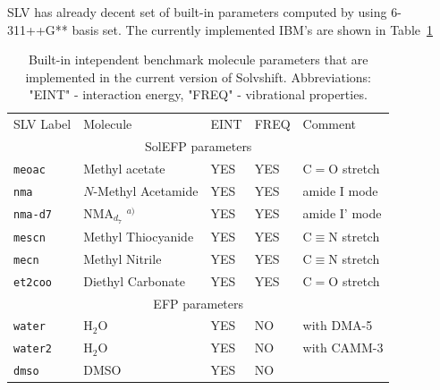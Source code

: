 \documentclass[a4paper,titlepage,twoside,fleqn,12pt]{book}
\begin{document}
\begin{refsection}
SLV has already decent set of built-in parameters computed 
by using 6-311++G** basis set. The currently implemented IBM's
are shown in Table~\ref{t:slv-ibm-buitin}
%
\begin{table}[t!]
\caption{
Built-in intependent benchmark molecule parameters that are implemented
in the current version of {\sc Solvshift}. Abbreviations: "EINT" - interaction
energy, "FREQ" - vibrational properties.
\label{t:slv-ibm-buitin}}
\begin{tabular*}{1.0\textwidth}{@{\extracolsep{\fill} } lllll}
\hline\hline
 SLV Label             & Molecule                        & EINT &   FREQ   &     Comment                              \\
\multicolumn{5}{c}{SolEFP parameters} \\                                                           
\hline                                                                      
 \tt{meoac           } & Methyl acetate                  & YES  &   YES    &     C$=$O stretch                        \\ 
 \tt{nma             } & $N$-Methyl Acetamide            & YES  &   YES    &     amide I mode                         \\
 \tt{nma-d7          } & NMA$_{d_7}$ $^{a)}$             & YES  &   YES    &     amide I' mode                        \\
 \tt{mescn           } & Methyl Thiocyanide              & YES  &   YES    &     C$\equiv$N stretch                   \\
 \tt{mecn            } & Methyl Nitrile                  & YES  &   YES    &     C$\equiv$N stretch                   \\
 \tt{et2coo          } & Diethyl Carbonate               & YES  &   YES    &     C$=$O stretch                        \\
\multicolumn{5}{c}{EFP parameters} \\                                                                                   
\hline                                                                                                                  
 \tt{water           } & H$_2$O                          & YES  &   NO     &     with DMA-5                           \\
 \tt{water2          } & H$_2$O                          & YES  &   NO     &     with CAMM-3                          \\
 \tt{dmso            } & DMSO                            & YES  &   NO     &                                          \\

\end{tabular*}
\end{table}
\end{refsection}
\end{document}
